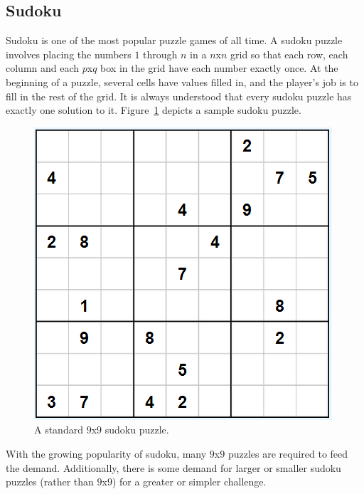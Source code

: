 \subsection{Sudoku}
Sudoku is one of the most popular puzzle games of all time. A sudoku puzzle involves placing the numbers $1$ through $n$ in
a $n$x$n$ grid so that each row, each column and each $p$x$q$ box in the grid have each number exactly once. At the beginning of
a puzzle, several cells have values filled in, and the player's job is to fill in the rest of the grid. It is always
understood that every sudoku puzzle has exactly one solution to it. Figure~\ref{fig:sudoku} depicts a sample sudoku puzzle.
\begin{figure}[H]
    \centering
    \includegraphics[scale=0.70]{sudoku.png}
    \caption{A standard $9$x$9$ sudoku puzzle.}
    \label{fig:sudoku}
\end{figure}

With the growing popularity of sudoku, many $9$x$9$ puzzles are required to feed the demand. Additionally, there is some demand
for larger or smaller sudoku puzzles (rather than $9$x$9$) for a greater or simpler challenge.

